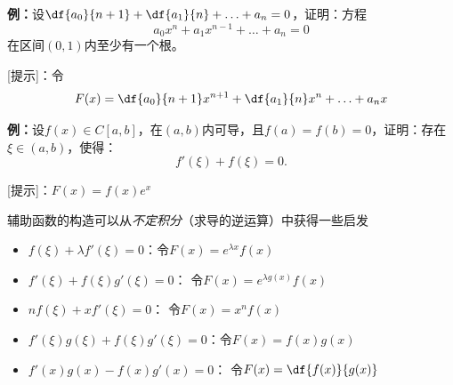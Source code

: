 {\bf 例：}设$\df{a_0}{n+1}+\df{a_1}{n}+\ldots+a_n=0$，证明：方程
$$a_0x^n+a_1x^{n-1}+\ldots+a_n=0$$
在区间$(0,1)$内至少有一个根。

[提示]：令
$$F(x)=\df{a_0}{n+1}x^{n+1}+\df{a_1}{n}x^n+\ldots+a_nx$$

{\bf 例：}设$f(x)\in C[a,b]$，在$(a,b)$内可导，且$f(a)=f(b)=0$，证明：存在
$\xi\in(a,b)$，使得：
$$f'(\xi)+f(\xi)=0.$$

[提示]：$F(x)=f(x)e^x$

\begin{thx}
	辅助函数的构造可以从{\it 不定积分}（求导的逆运算）中获得一些启发
	\begin{itemize}
	  \setlength{\itemindent}{1cm}
	  \item $f(\xi)+\lambda f'(\xi)=0$：令$F(x)=e^{\lambda x}f(x)$
	  \item $f'(\xi)+f(\xi)g'(\xi)=0$： 令$F(x)=e^{\lambda g(x)}f(x)$
	  \item $nf(\xi)+xf'(\xi)=0$： 令$F(x)=x^nf(x)$ 
	  \item $f'(\xi)g(\xi)+f(\xi)g'(\xi)=0$：令$F(x)=f(x)g(x)$
	  \item $f'(x)g(x)-f(x)g'(x)=0$： 令$F(x)=\df{f(x)}{g(x)}$
	\end{itemize}
\end{thx}

